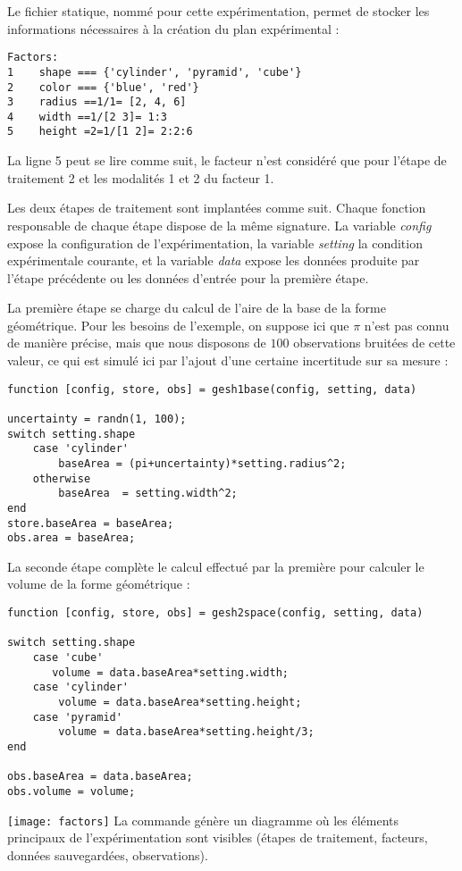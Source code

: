 Le fichier statique, nommé  pour cette expérimentation, permet de stocker les informations nécessaires à la création du plan expérimental :
\begin{lstlisting}
Factors:
1    shape === {'cylinder', 'pyramid', 'cube'}
2    color === {'blue', 'red'}
3    radius ==1/1= [2, 4, 6]
4    width ==1/[2 3]= 1:3
5    height =2=1/[1 2]= 2:2:6
\end{lstlisting}
La ligne 5 peut se lire comme suit, le facteur  n'est considéré que pour l'étape de traitement 2 et les modalités 1 et 2 du facteur 1.

Les deux étapes de traitement sont implantées comme suit. Chaque fonction responsable de chaque étape dispose de la même signature. La variable \textsl{config} expose la configuration de l'expérimentation, la variable \textsl{setting} la condition expérimentale courante, et la variable \textsl{data} expose les données produite par l'étape précédente ou les données d'entrée pour la première étape.

La première étape se charge du calcul de l'aire de la base de la forme géométrique. Pour les besoins de l'exemple, on suppose ici que $\pi$ n'est pas connu de manière précise, mais que nous disposons de $100$ observations bruitées de cette valeur, ce qui est simulé ici par l'ajout d'une certaine incertitude sur sa mesure :
\begin{lstlisting}
function [config, store, obs] = gesh1base(config, setting, data)

uncertainty = randn(1, 100);
switch setting.shape
    case 'cylinder'
        baseArea = (pi+uncertainty)*setting.radius^2;
    otherwise
        baseArea  = setting.width^2;
end
store.baseArea = baseArea;
obs.area = baseArea;
\end{lstlisting}

La seconde étape complète le calcul effectué par la première pour calculer le volume de la forme géométrique :
\begin{lstlisting}
function [config, store, obs] = gesh2space(config, setting, data)

switch setting.shape
    case 'cube'
       volume = data.baseArea*setting.width;
    case 'cylinder'
        volume = data.baseArea*setting.height;
    case 'pyramid'
        volume = data.baseArea*setting.height/3;
end

obs.baseArea = data.baseArea;
obs.volume = volume;
\end{lstlisting}

\begin{marginfigure}
\texttt{[image: factors]}
La commande  génère un diagramme où les éléments principaux de l'expérimentation sont visibles (étapes de traitement, facteurs, données sauvegardées, observations).
\end{marginfigure}

